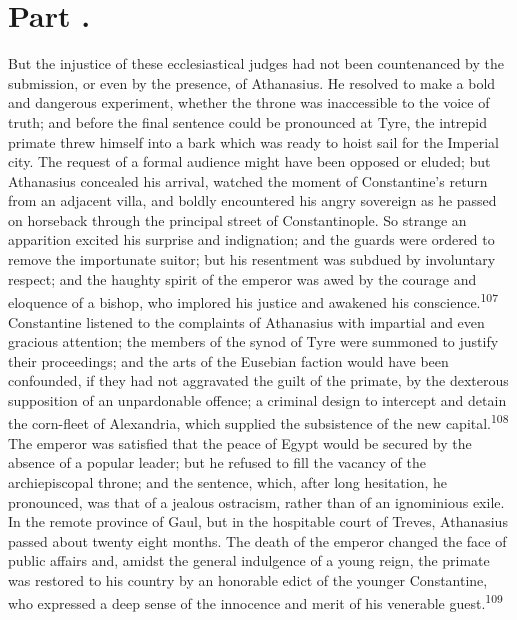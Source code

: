 

\section{Part \thesection.}

But the injustice of these ecclesiastical judges had not been
countenanced by the submission, or even by the presence, of
Athanasius. He resolved to make a bold and dangerous experiment,
whether the throne was inaccessible to the voice of truth; and
before the final sentence could be pronounced at Tyre, the
intrepid primate threw himself into a bark which was ready to
hoist sail for the Imperial city. The request of a formal
audience might have been opposed or eluded; but Athanasius
concealed his arrival, watched the moment of Constantine’s return
from an adjacent villa, and boldly encountered his angry
sovereign as he passed on horseback through the principal street
of Constantinople. So strange an apparition excited his surprise
and indignation; and the guards were ordered to remove the
importunate suitor; but his resentment was subdued by involuntary
respect; and the haughty spirit of the emperor was awed by the
courage and eloquence of a bishop, who implored his justice and
awakened his conscience.\textsuperscript{107} Constantine listened to the
complaints of Athanasius with impartial and even gracious
attention; the members of the synod of Tyre were summoned to
justify their proceedings; and the arts of the Eusebian faction
would have been confounded, if they had not aggravated the guilt
of the primate, by the dexterous supposition of an unpardonable
offence; a criminal design to intercept and detain the corn-fleet
of Alexandria, which supplied the subsistence of the new capital.\textsuperscript{108}
The emperor was satisfied that the peace of Egypt would be
secured by the absence of a popular leader; but he refused to
fill the vacancy of the archiepiscopal throne; and the sentence,
which, after long hesitation, he pronounced, was that of a
jealous ostracism, rather than of an ignominious exile. In the
remote province of Gaul, but in the hospitable court of Treves,
Athanasius passed about twenty eight months. The death of the
emperor changed the face of public affairs and, amidst the
general indulgence of a young reign, the primate was restored to
his country by an honorable edict of the younger Constantine, who
expressed a deep sense of the innocence and merit of his
venerable guest.\textsuperscript{109}

